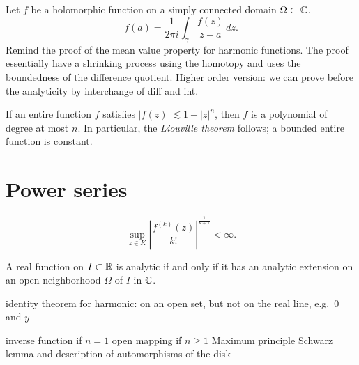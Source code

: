 \documentclass{../../large}
\begin{document}
\begin{prb}
Let $f$ be a holomorphic function on a simply connected domain $\Omega\subset\mathbb{C}$.
\[f(a)=\frac1{2\pi i}\int_\gamma\frac{f(z)}{z-a}\,dz.\]
Remind the proof of the mean value property for harmonic functions.
The proof essentially have a shrinking process using the homotopy and uses the boundedness of the difference quotient.
Higher order version: we can prove before the analyticity by interchange of diff and int.
\end{prb}
\begin{pf}

\end{pf}




\begin{prb}
\begin{parts}
\item If an entire function $f$ satisfies $|f(z)|\lesssim1+|z|^n$, then $f$ is a polynomial of degree at most $n$. In particular, the \emph{Liouville theorem} follows; a bounded entire function is constant.
\end{parts}
\end{prb}



\section{Power series}

\begin{prb}
\[\sup_{z\in K}\left|\frac{f^{(k)}(z)}{k!}\right|^{\frac1{k+1}}<\infty.\]
\begin{parts}
\item
A real function on $I\subset\mathbb{R}$ is analytic if and only if it has an analytic extension on an open neighborhood $\Omega$ of $I$ in $\mathbb{C}$.
\end{parts}
\end{prb}




\begin{prb}
\end{prb}
identity theorem for harmonic: on an open set, but not on the real line, e.g.~$0$ and $y$

\begin{prb}
\end{prb}
inverse function if $n=1$
open mapping if $n\ge1$
Maximum principle
Schwarz lemma and description of automorphisms of the disk
\end{document}
